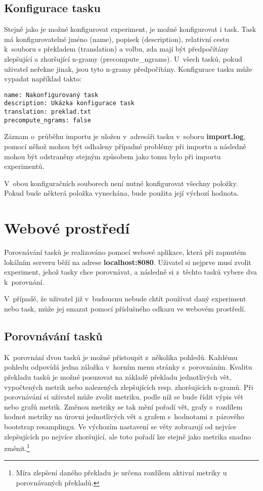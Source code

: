 \subsection{Konfigurace tasku}
Stejně jako je možné konfigurovat experiment, je možné konfigurovat i task.
Task má konfigurovatelné jméno (name), popisek (description),
  relativní cestu k~souboru s překladem (translation) a volbu,
  zda mají být předpočítány zlepšující a zhoršující \mbox{n-gramy} (precompute\_ngrams).
U~všech tasků, pokud uživatel neřekne jinak, 
  jsou tyto \mbox{n-gramy} předpočítány.
Konfigurace tasku může vypadat například takto:

\begin{verbatim}
name: Nakonfigurovaný task
description: Ukázka konfigurace task
translation: preklad.txt
precompute_ngrams: false
\end{verbatim}

Záznam o~průběhu importu je uložen v~adresáři tasku v~soboru \textbf{import.log},
  pomocí něhož mohou být odhaleny případné problémy při importu
  a následně mohou být odstraněny stejným způsobem jako tomu bylo při importu experimentů.

V~obou konfiguračních souborech není nutné konfigurovat všechny položky.
Pokud bude některá položka vynechána,
  bude použita její výchozí hodnota. 

\section{Webové prostředí}
Porovnávání tasků je realizováno pomocí webové aplikace,
  která při zapnutém lokálním serveru běží na adrese \textbf{localhost:8080}.
Uživatel si nejprve musí zvolit experiment,
  jehož tasky chce porovnávat, a následně si z~těchto tasků vybere dva k~porovnání.

V~případě,
  že uživatel již v~budoucnu nebude chtít používat daný experiment nebo task,
  může jej smazat pomocí příslušného odkazu ve webovém prostředí.

\subsection{Porovnávání tasků}
K~porovnání dvou tasků je možné přistoupit z~několika pohledů.
Každému pohledu odpovídá jedna záložka v~horním menu stránky s~porovnáním.
Kvalitu překladu tasků je možné posuzovat na základě překladu jednotlivých vět,
  vypočtených metrik nebo nalezených zlepšujících resp. zhoršujících \mbox{n-gramů}.
Při porovnávání si uživatel může zvolit metriku,
  podle níž se bude řídit výpis vět nebo grafů metrik.
Změnou metriky se tak mění pořadí vět,
  grafy s~rozdílem hodnot metriky na úrovni jednotlivých vět
  a grafem s~hodnotami z~párového bootstrap resamplingu.
Ve výchozím nastavení se věty zobrazují od nejvíce zlepšujících po nejvíce zhoršující,
  ale toto pořadí lze stejně jako metrika snadno změnit.\footnote{
    Míra zlepšení daného překladu je určena rozdílem aktivní metriky u porovnávaných překladů.
  }

